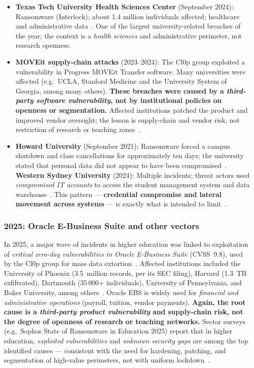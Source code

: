 \begin{itemize}[nosep]
    \item \textbf{Texas Tech University Health Sciences Center}
    (September 2024): Ransomware (Interlock); about 1.4 million individuals
    affected; healthcare and administrative
    data~\cite{ttuhsc-breach2024}. One of the largest
    university-related breaches of the year; the context is a \emph{health
    sciences} and administrative perimeter, not research openness.
    \item \textbf{MOVEit supply-chain attacks} (2023--2024): The Cl0p
    group exploited a vulnerability in Progress MOVEit Transfer software.
    Many universities were affected (e.g.\ UCLA, Stanford Medicine and the
    University System of Georgia, among many others). \textbf{These breaches were caused by a \emph{third-party
    software vulnerability}, not by institutional policies on openness or
    segmentation.} Affected institutions patched the product and improved
    vendor oversight; the lesson is supply-chain and vendor risk, not
    restriction of research or teaching zones~\cite{moveit-breach,verizon-dbir2024}.
    \item \textbf{Howard University} (September 2021): Ransomware forced
    a campus shutdown and class cancellations for approximately ten days;
    the university stated that personal data did not appear to have been
    compromised~\cite{howard-breach2021}. \textbf{Western Sydney
    University} (2024): Multiple incidents; threat actors used
    \emph{compromised IT accounts} to access the student management system
    and data warehouse~\cite{wsu-breach2024}. This pattern --- \textbf{credential compromise and
    lateral movement across systems} --- is exactly what  is intended to limit~\cite{elisity-edu}.
\end{itemize}

\subsubsection{2025: Oracle E-Business Suite and other vectors}

In 2025, a major wave of incidents in higher education was linked to
exploitation of \emph{critical zero-day vulnerabilities in Oracle
E-Business Suite} (CVSS~9.8), used by the Cl0p group
for mass data extortion~\cite{oracle-ebs-edu2025}. Affected institutions included the University
of Phoenix (3.5~million records, per its SEC filing), Harvard
(1.3~TB exfiltrated), Dartmouth (35\,000+ individuals), University of
Pennsylvania, and Baker University, among
others~\cite{oracle-ebs-edu2025}. Oracle EBS is widely used for
\emph{financial and administrative operations} (payroll, tuition, vendor
payments). \textbf{Again, the root
cause is a \emph{third-party product vulnerability} and supply-chain risk,
not the degree of openness of research or teaching networks.} Sector
surveys (e.g.\ Sophos State of Ransomware in Education 2025) report that
in higher education, \emph{exploited vulnerabilities} and \emph{unknown
security gaps} are among the top identified causes --- consistent with
the need for hardening, patching, and segmentation of high-value
perimeters, not with uniform lockdown~\cite{oracle-ebs-edu2025,sophos-ransomware-edu2025}.

